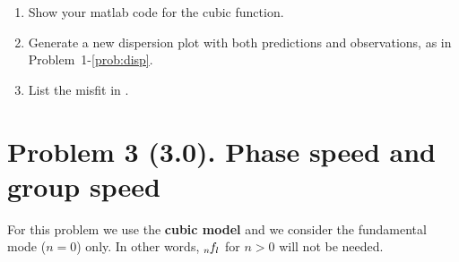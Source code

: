 \documentclass[11pt,titlepage,fleqn]{article}
\newcommand{\fnl}{\mbox{${}_{n\hspace{-0.2 mm}}f_l$}}
\begin{document}
\begin{enumerate}
\begin{enumerate}
\item Show your matlab code for the cubic function.
\item Generate a new dispersion plot with both predictions and observations, as in Problem~1-\ref{prob:disp}.
\item List the misfit in .
\end{enumerate}

\label{prob:earth_cubic}



\end{enumerate}


\section*{Problem 3 (3.0). Phase speed and group speed}

For this problem we use the {\bf cubic model} and we consider the fundamental mode ($n=0$) only. In other words, $\fnl$ for $n > 0$ will not be needed.
\end{document}
